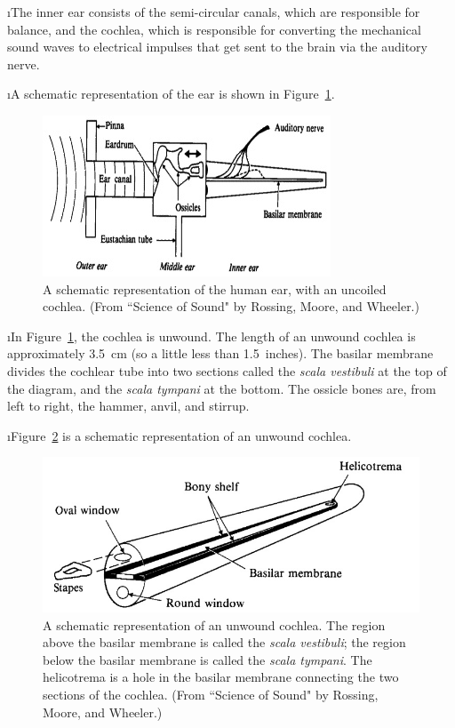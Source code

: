 \i The inner ear consists of the semi-circular canals,
which are responsible for balance, and the 
cochlea, which is responsible for converting the mechanical
sound waves to electrical impulses that get sent to the
brain via the auditory nerve.

\i A schematic representation of the ear is shown in
Figure~\ref{f:human-ear-schematic}.
%
\begin{figure}[htbp]
\begin{center}
\includegraphics[width=.8\textwidth]{human-ear-schematic.jpg}
\caption{A schematic representation of the human ear, with an
uncoiled cochlea.
(From ``Science of Sound" by Rossing, Moore, and Wheeler.)}
\label{f:human-ear-schematic}
\end{center}
\end{figure}
%

\i In Figure~\ref{f:human-ear-schematic}, the cochlea is unwound.
The length of an unwound cochlea is approximately 3.5~cm (so a 
little less than 1.5~inches).
The basilar membrane divides the cochlear tube into two sections
called the {\em scala vestibuli} at the top of the diagram, 
and the {\em scala tympani} at the bottom.
The ossicle bones are, from left to right, 
the hammer, anvil, and stirrup.

\i Figure~\ref{f:cochlea-uncoiled} is a schematic
representation of an unwound cochlea.
%
\begin{figure}[htbp]
\begin{center}
\includegraphics[width=.8\textwidth]{cochlea-uncoiled.jpg}
\caption{A schematic representation of an unwound cochlea.
The region above the basilar membrane is called the {\em scala vestibuli};
the region below the basilar membrane is called the {\em scala tympani}.
The helicotrema is a hole in the basilar membrane connecting
the two sections of the cochlea. 
(From ``Science of Sound" by Rossing, Moore, and Wheeler.)}
\label{f:cochlea-uncoiled}
\end{center}
\end{figure}
%

